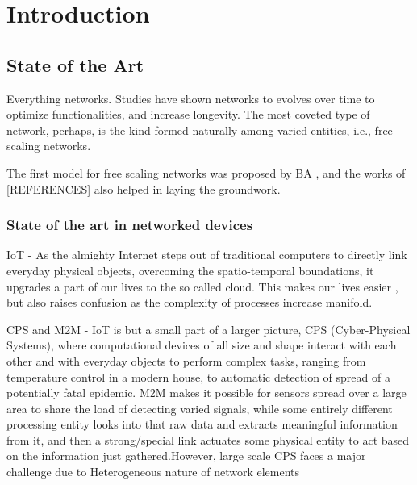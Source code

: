 
\chapter{Introduction} %

\label{Chapter1} %



\section{State of the Art}
Everything networks. Studies have shown networks to evolves over time to optimize functionalities, and increase longevity. The most coveted type of network, perhaps, is the kind formed naturally among varied entities, i.e., free scaling networks.

The first model for free scaling networks was proposed by BA , and the works of [REFERENCES] also helped in laying the groundwork.

\subsection{State of the art in networked devices}

IoT - As the almighty Internet steps out of traditional computers to directly link everyday physical objects, overcoming the spatio-temporal boundations, it upgrades a part of our lives to the so called cloud.
This makes our lives easier , but also raises confusion as the complexity of processes increase manifold. 

CPS and M2M - IoT is but a small part of a larger picture, CPS (Cyber-Physical Systems), where computational devices of all size and shape interact with each other and with everyday objects to perform complex tasks, ranging from temperature control in a modern house, to automatic detection of spread of a potentially fatal epidemic.
M2M makes it possible for sensors spread over a large area to share the load of detecting varied signals, while some entirely different processing entity looks into that raw data and extracts meaningful information from it, and then a strong/special link actuates some physical entity to act based on the  information just gathered.However, large scale CPS faces a major challenge due to Heterogeneous nature of network elements

